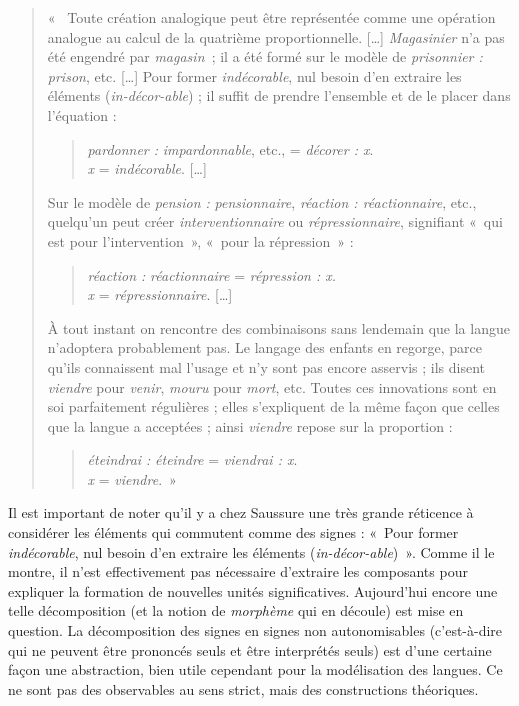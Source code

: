 {    \begin{quote}
    «~ Toute création analogique peut être représentée comme une opération analogue au calcul de la quatrième proportionnelle. […] \textit{Magasinier} n’a pas été engendré par \textit{magasin~}; il a été formé sur le modèle de \textit{prisonnier :} \textit{prison}, etc. […] Pour former \textit{indécorable}, nul besoin d’en extraire les éléments (\textit{in-décor-able}) ; il suffit de prendre l’ensemble et de le placer dans l’équation :
        
        \begin{quote}
        \textit{pardonner :} \textit{impardonnable}, etc., = \textit{décorer : x}.\\
        \noindent\textit{x} = \textit{indécorable}. […]
        \end{quote}

    Sur le modèle de \textit{pension :} \textit{pensionnaire}, \textit{réaction : réactionnaire}, etc., quelqu’un peut créer \textit{interventionnaire} ou \textit{répressionnaire}, signifiant «~qui est pour l’intervention~», «~pour la répression~» :
    
        \begin{quote}
        \textit{réaction :} \textit{réactionnaire} = \textit{répression : x.}\\
        \noindent\textit{x} = \textit{répressionnaire}. […]
        \end{quote}

    À tout instant on rencontre des combinaisons sans lendemain que la langue n’adoptera probablement pas. Le langage des enfants en regorge, parce qu’ils connaissent mal l’usage et n’y sont pas encore asservis ; ils disent \textit{viendre} pour \textit{venir}, \textit{mouru} pour \textit{mort}, etc. Toutes ces innovations sont en soi parfaitement régulières ; elles s’expliquent de la même façon que celles que la langue a acceptées ; ainsi \textit{viendre} repose sur la proportion :

    \begin{quote}
    \textit{éteindrai :} \textit{éteindre} = \textit{viendrai : x}.\\
    \noindent\textit{x} = \textit{viendre}.~»
    \end{quote}
    \end{quote}

    Il est important de noter qu’il y a chez Saussure une très grande réticence à considérer les éléments qui commutent comme des signes : «~Pour former \textit{indécorable}, nul besoin d’en extraire les éléments (\textit{in-décor-able})~». Comme il le montre, il n’est effectivement pas nécessaire d’extraire les composants pour expliquer la formation de nouvelles unités significatives. Aujourd’hui encore une telle décomposition (et la notion de \textit{morphème} qui en découle) est mise en question. La décomposition des signes en signes non autonomisables (c’est-à-dire qui ne peuvent être prononcés seuls et être interprétés seuls) est d’une certaine façon une abstraction, bien utile cependant pour la modélisation des langues. Ce ne sont pas des observables au sens strict, mais des constructions théoriques.
}
